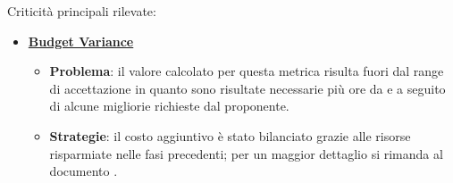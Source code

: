 \FloatBarrier
Criticità principali rilevate:
\begin{itemize}
\item \hyperref[budgetVariance]{\textbf{Budget Variance}}
\begin{itemize}
\item \textbf{Problema}: il valore calcolato per questa metrica risulta fuori dal range di accettazione in quanto sono risultate necessarie più ore da \rpt e \rVt a seguito di alcune migliorie richieste dal proponente.
\item \textbf{Strategie}: il costo aggiuntivo è stato bilanciato grazie alle risorse risparmiate nelle fasi precedenti; per un maggior dettaglio si rimanda al documento \pianoDiProgetto.
\end{itemize}
\end{itemize}
